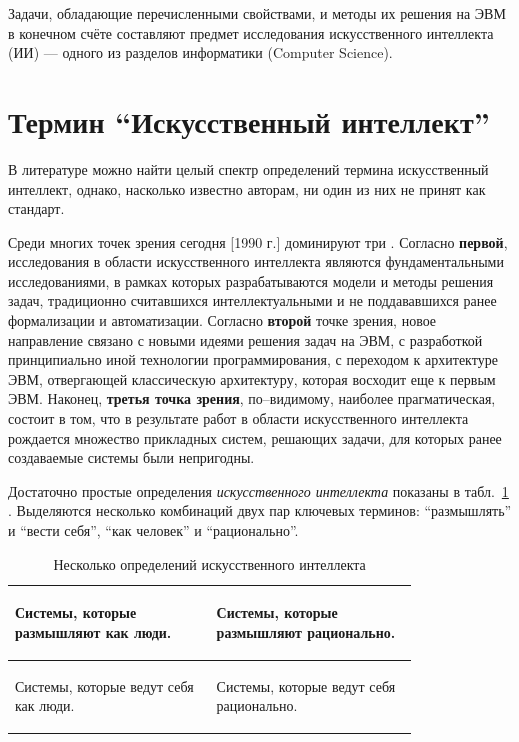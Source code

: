 \documentclass[12pt, openany, twoside]{book} %
\begin{document}
Задачи,  обладающие перечисленными свойствами, и методы их решения на ЭВМ в конечном счёте составляют предмет исследования искусственного интеллекта (ИИ) --- одного из разделов информатики (Computer Science).

\section{Термин ``Искусственный интеллект''}

В литературе можно найти целый спектр определений термина искусственный интеллект, однако, насколько известно авторам, ни один из них не принят как стандарт.

Среди многих точек зрения сегодня [1990 г.] доминируют три \cite{AIDictionary}. Согласно {\bf первой}, исследования в области искусственного интеллекта являются фундаментальными исследованиями, в рамках которых разрабатываются модели и методы решения задач, традиционно считавшихся интеллектуальными и не поддававшихся ранее формализации и автоматизации. Согласно {\bf второй} точке зрения, новое направление связано с новыми идеями решения задач на ЭВМ, с разработкой принципиально иной технологии программирования, с переходом к архитектуре ЭВМ, отвергающей классическую архитектуру, которая восходит еще к первым ЭВМ. Наконец, {\bf третья точка зрения}, по--видимому, наиболее прагматическая, состоит в том, что в результате работ в области искусственного интеллекта рождается множество прикладных систем, решающих задачи, для которых ранее создаваемые системы были непригодны.

Достаточно простые определения {\em искусственного интеллекта} показаны в табл.~\ref{pic:determai} \cite{Russell}. Выделяются несколько комбинаций двух пар ключевых терминов: ``размышлять'' и ``вести себя'', ``как человек'' и ``рационально''.

\begin{table}[h]
\caption{Несколько определений искусственного интеллекта} \label{pic:determai}
\begin{center}
\begin{tabular}{|p{0.4\linewidth}|p{0.4\linewidth}|}
 \hline
 \begin{raggedright}
   Системы, которые размышляют как люди.
 \end{raggedright}
 &
 \begin{raggedright}
   Системы, которые размышляют рационально.
 \end{raggedright}
 \\\hline
 \begin{raggedright}
   Системы, которые ведут себя как
   люди.
 \end{raggedright}
 &
 \begin{raggedright}
   Системы, которые ведут себя рационально.
 \end{raggedright}
   \\\hline
\end{tabular}
\end{center}
\end{table}
\end{document}
